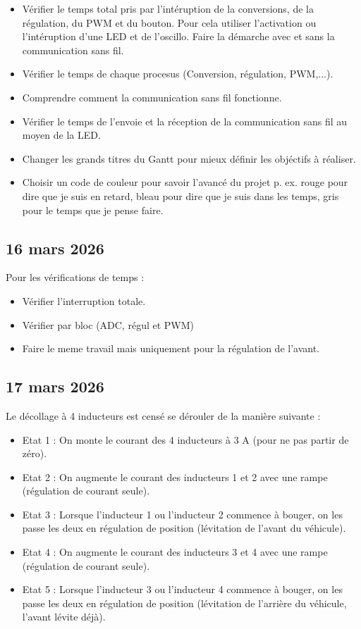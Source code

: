 \begin{itemize}
    \item Vérifier le temps total pris par l'intéruption de la conversions, de la régulation, du PWM et du bouton. Pour cela utiliser l'activation ou l'intéruption d'une LED et de l'oscillo. Faire la démarche avec et sans la communication sans fil.

    \item Vérifier le temps de chaque procesus (Conversion, régulation, PWM,...).

    \item Comprendre comment la communication sans fil fonctionne.

    \item Vérifier le temps de l'envoie et la réception de la communication sans fil au moyen de la LED.

    \item Changer les grands titres du Gantt pour mieux définir les objéctifs à réaliser.
    \item Choisir un code de couleur pour savoir l'avancé du projet p. ex. rouge pour dire que je suis en retard, bleau pour dire que je suis dans les temps, gris pour le temps que je pense faire.
\end{itemize}

\subsection*{16 mars 2026}
Pour les vérifications de temps :
\begin{itemize}
    \item Vérifier l'interruption totale.
    \item Vérifier par bloc (ADC, régul et PWM)
    \item Faire le meme travail mais uniquement pour la régulation de l'avant.
\end{itemize}

\subsection*{17 mars 2026}
Le décollage à 4 inducteurs est censé se dérouler de la manière suivante :

\begin{itemize}
    \item Etat 1 : On monte le courant des 4 inducteurs à 3 A (pour ne pas partir de zéro).
    \item Etat 2 : On augmente le courant des inducteurs 1 et 2 avec une rampe (régulation de courant seule).
    \item Etat 3 : Lorsque l'inducteur 1 ou l'inducteur 2 commence à bouger, on les passe les deux en régulation de position (lévitation de l'avant du véhicule).
    \item Etat 4 : On augmente le courant des inducteurs 3 et 4 avec une rampe (régulation de courant seule).
    \item Etat 5 : Lorsque l'inducteur 3 ou l'inducteur 4 commence à bouger, on les passe les deux en régulation de position (lévitation de l'arrière du véhicule, l'avant lévite déjà).
\end{itemize}


